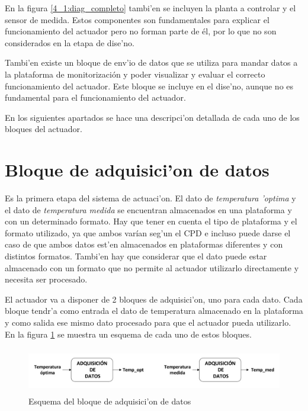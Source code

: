 	En la figura \ref{4_1:diag_completo} tambi'en se incluyen la planta a controlar y el sensor de medida. Estos componentes son fundamentales para explicar el funcionamiento del actuador pero no forman parte de él, por lo que no son considerados en la etapa de dise'no. 

	Tambi'en existe un bloque de env'io de datos que se utiliza para mandar datos a la plataforma de monitorización y poder visualizar y evaluar el correcto funcionamiento del actuador. Este bloque se incluye en el dise'no, aunque no es fundamental para el funcionamiento del actuador.

	En los siguientes apartados se hace una descripci'on detallada de cada uno de los bloques del actuador.

\section{Bloque de adquisici'on de datos}\label{sec:adquisicion}

	Es la primera etapa del sistema de actuaci'on. El dato de \textit{temperatura 'optima} y el dato de \textit{temperatura medida} se encuentran almacenados en una plataforma y con un determinado formato. Hay que tener en cuenta el tipo de plataforma y el formato utilizado, ya que ambos varían seg'un el CPD e incluso puede darse el caso de que ambos datos est'en almacenados en plataformas diferentes y con distintos formatos. Tambi'en hay que considerar que el dato puede estar almacenado con un formato que no permite al actuador utilizarlo directamente y necesita ser procesado.

	El actuador va a disponer de 2 bloques de adquisici'on, uno para cada dato. Cada bloque tendr'a como entrada el dato de temperatura almacenado en la plataforma y como salida ese mismo dato procesado para que el actuador pueda utilizarlo. En la figura \ref{4_2:diag_adquisicion} se muestra un esquema de cada uno de estos bloques.	

\begin{figure}[htbp]
  \centering
  \includegraphics[width=142mm,height=20mm]{imagenes/capitulo4/4_2Bloque_Adquisicion}
   \caption{Esquema del bloque de adquisici'on de datos}
   \label{4_2:diag_adquisicion}
\end{figure}


